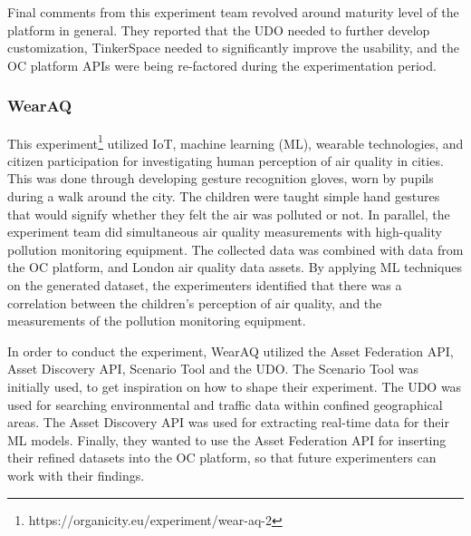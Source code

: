 Final comments from this experiment team revolved around maturity level of the platform in general. They reported that the UDO needed to further develop customization, TinkerSpace needed to significantly improve the usability, and the OC platform APIs were being re-factored during the experimentation period.

\subsubsection{WearAQ}

This experiment\footnote{https://organicity.eu/experiment/wear-aq-2} utilized IoT, machine learning (ML), wearable technologies, and citizen participation for investigating human perception of air quality in cities. This was done through developing gesture recognition gloves, worn by pupils during a walk around the city. The children were taught simple hand gestures that would signify whether they felt the air was polluted or not. In parallel, the experiment team did simultaneous air quality measurements with high-quality pollution monitoring equipment. The collected data was combined with data from the OC platform, and London air quality data assets. By applying ML techniques on the generated dataset, the experimenters identified that there was a correlation between the children's perception of air quality, and the measurements of the pollution monitoring equipment. 

In order to conduct the experiment, WearAQ utilized the Asset Federation API, Asset Discovery API, Scenario Tool and the UDO. The Scenario Tool was initially used, to get inspiration on how to shape their experiment. The UDO was used for searching environmental and traffic data within confined geographical areas. The Asset Discovery API was used for extracting real-time data for their ML models. Finally, they wanted to use the Asset Federation API for inserting their refined datasets into the OC platform, so that future experimenters can work with their findings.

